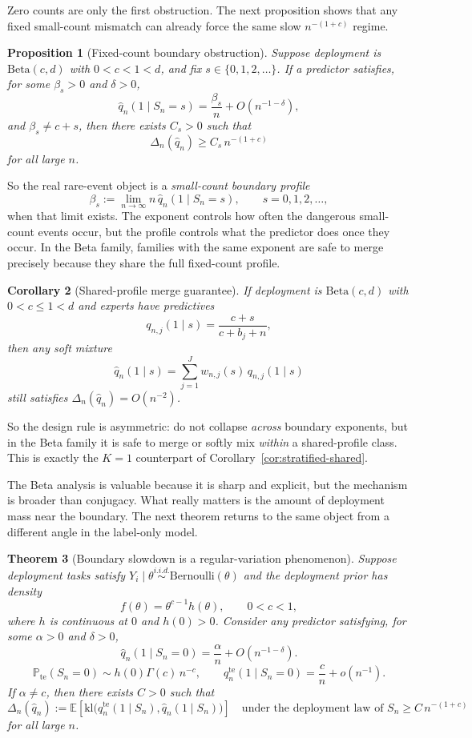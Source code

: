 \documentclass{article}
\newtheorem{theorem}{Theorem}
\newtheorem{proposition}[theorem]{Proposition}
\newtheorem{corollary}[theorem]{Corollary}
\theoremstyle{definition}
\theoremstyle{remark}
\newcommand{\E}{\mathbb{E}}
\newcommand{\Pbb}{\mathbb{P}}
\newcommand{\Ber}{\mathrm{Bernoulli}}
\newcommand{\BetaDist}{\mathrm{Beta}}
\newcommand{\te}{\mathrm{te}}
\newcommand{\klb}{\mathrm{kl}}
\begin{document}
Zero counts are only the first obstruction. The next proposition shows that any fixed small-count mismatch can already force the same slow $n^{-(1+c)}$ regime.

\begin{proposition}[Fixed-count boundary obstruction]
\label{prop:fixed-count}
Suppose deployment is $\BetaDist(c,d)$ with $0<c<1<d$, and fix $s\in\{0,1,2,\dots\}$. If a predictor satisfies, for some $\beta_s>0$ and $\delta>0$,
\[
\hat q_n(1\mid S_n=s)=\frac{\beta_s}{n}+O(n^{-1-\delta}),
\]
and $\beta_s\neq c+s$, then there exists $C_s>0$ such that
\[
\Delta_n(\hat q_n)\ge C_s\,n^{-(1+c)}
\]
for all large $n$.
\end{proposition}

So the real rare-event object is a \emph{small-count boundary profile}
\[
\beta_s := \lim_{n\to\infty} n\,\hat q_n(1\mid S_n=s),
\qquad s=0,1,2,\dots,
\]
when that limit exists. The exponent controls how often the dangerous small-count events occur, but the profile controls what the predictor does once they occur. In the Beta family, families with the same exponent are safe to merge precisely because they share the full fixed-count profile.

\begin{corollary}[Shared-profile merge guarantee]
\label{cor:beta-shared}
If deployment is $\BetaDist(c,d)$ with $0<c\le 1<d$ and experts have predictives
\[
q_{n,j}(1\mid s)=\frac{c+s}{c+b_j+n},
\]
then any soft mixture
\[
\hat q_n(1\mid s)=\sum_{j=1}^J w_{n,j}(s)\,q_{n,j}(1\mid s)
\]
still satisfies $\Delta_n(\hat q_n)=O(n^{-2})$.
\end{corollary}

So the design rule is asymmetric: do not collapse \emph{across} boundary exponents, but in the Beta family it is safe to merge or softly mix \emph{within} a shared-profile class. This is exactly the $K=1$ counterpart of Corollary~\ref{cor:stratified-shared}.

The Beta analysis is valuable because it is sharp and explicit, but the mechanism is broader than conjugacy. What really matters is the amount of deployment mass near the boundary. The next theorem returns to the same object from a different angle in the label-only model.

\begin{theorem}[Boundary slowdown is a regular-variation phenomenon]
\label{thm:boundary-general}
Suppose deployment tasks satisfy $Y_i\mid \theta \stackrel{i.i.d.}{\sim} \Ber(\theta)$ and the deployment prior has density
\[
f(\theta)=\theta^{c-1}h(\theta),
\qquad
0<c<1,
\]
where $h$ is continuous at $0$ and $h(0)>0$. Consider any predictor satisfying, for some $\alpha>0$ and $\delta>0$,
\[
\hat q_n(1\mid S_n=0)=\frac{\alpha}{n}+O(n^{-1-\delta}).
\]
\[
\Pbb_{\te}(S_n=0)\sim h(0)\Gamma(c)\,n^{-c},
\qquad
q_n^{\te}(1\mid S_n=0)=\frac{c}{n}+o(n^{-1}).
\]
If $\alpha\neq c$, then there exists $C>0$ such that
\[
\Delta_n(\hat q_n)
:=
\E
\left[
\klb\bigl(
q_n^{\te}(1\mid S_n),
\hat q_n(1\mid S_n)
\bigr)
\right]
\quad\text{under the deployment law of }S_n
\ge
C\,n^{-(1+c)}
\]
for all large $n$.
\end{theorem}
\end{document}
